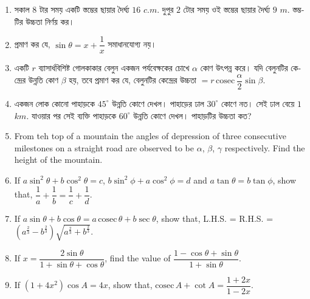 \documentclass[11pt, a4paper]{article}
\begin{document}
\begin{enumerate}
	\item \textbengali{সকাল} $8$ \textbengali{টার সময় একটি স্তম্ভের ছায়ার দৈর্ঘ্য} $16$ $c.m.$ \textbengali{দুপুর} $2$ \textbengali{টোর সময় ওই স্তম্ভের ছায়ার দৈর্ঘ্য} $9$ $m.$ \textbengali{স্তম্ভটির উচ্চতা নির্ণয় কর।}
	
	\item \textbengali{প্রমাণ কর যে,} $\sin \theta = x + \dfrac{1}{x}$ \textbengali{সমাধানযোগ্য নয়।}
	
	\item \textbengali{একটি} $r$ \textbengali{ব্যাসার্ধবিশিষ্ট গোলকাকার বেলুন একজন পর্যবেক্ষকের চোখে} $\alpha$ \textbengali{কোণ উৎপন্ন করে। যদি বেলুনটির কেন্দ্রের উন্নতি কোণ} $\beta$ \textbengali{হয়, তবে প্রমাণ কর যে, বেলুনটির কেন্দ্রের উচ্চতা} $= r \, \mathrm{cosec\,} \dfrac{\alpha}{2} \sin \beta$.
	
	\item \textbengali{একজন লোক কোনো পাহাড়কে} $45^{\circ}$ \textbengali{উন্নতি কোণে দেখল। পাহাড়ের ঢাল} $30^{\circ}$ \textbengali{কোণে নত। সেই ঢাল বেয়ে} $1$ $km.$ \textbengali{যাওয়ার পর সেই ব্যক্তি পাহাড়কে} $60^{\circ}$ \textbengali{উন্নতি কোণে দেখল। পাহাড়টির উচ্চতা কত?}
	
	\item From teh top of a mountain the angles of depression of three consecutive milestones on a straight road are observed to be $\alpha$, $\beta$, $\gamma$ respectively. Find the height of the mountain.
	
	\item If $a \sin^2 \theta + b \cos^2 \theta = c$, $b \sin^2 \phi + a \cos^2 \phi = d$ and $a \tan \theta = b \tan \phi$, show that, $\dfrac{1}{a} + \dfrac{1}{b} = \dfrac{1}{c} + \dfrac{1}{d}$.
	
	\item If $a\sin \theta + b \cos \theta = a \, \mathrm{cosec}\, \theta + b \sec \theta$, show that, L.H.S. = R.H.S. = $\left( a^{\frac{2}{3}} - b^{\frac{2}{3}} \right) \sqrt{a^{\frac{2}{3}} + b^{\frac{2}{3}}}$.
	
	\item If $x = \dfrac{2 \sin \theta}{1 + \sin \theta + \cos \theta}$, find the value of $\dfrac{1-\cos \theta + \sin \theta}{1 + \sin \theta}$.
	
	\item If $\left( 1 + 4x^2 \right) \cos A = 4x$, show that, $\mathrm{cosec} \, A + \cot A = \dfrac{1+2x}{1-2x}$.
	
\end{enumerate}
\end{document}
